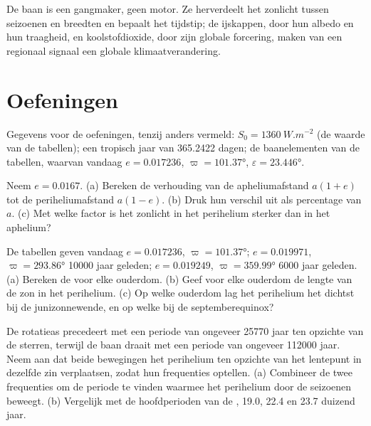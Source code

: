 De baan is een gangmaker, geen motor. Ze herverdeelt het zonlicht tussen seizoenen en breedten
en bepaalt het tijdstip; de ijskappen, door hun albedo en hun traagheid, en koolstofdioxide, door
zijn globale forcering, maken van een regionaal signaal een globale klimaatverandering.

\section*{Oefeningen}\label{sec:b2:orbital-forcing:exercises}

Gegevens voor de oefeningen, tenzij anders vermeld: $S_0 = \qty{1360}{W.m^{-2}}$ (de waarde van de
tabellen); een tropisch jaar van \num{365.2422} dagen; de baanelementen van de tabellen, waarvan vandaag
$e = 0.017236$, $\varpi = \ang{101.37}$, $\varepsilon = \ang{23.446}$.

\begin{exercise}[$\star$]\label{exo:b2:orbital-forcing:1}
Neem $e = 0.0167$. (a) Bereken de verhouding van de apheliumafstand $a(1 + e)$ tot de
periheliumafstand $a(1 - e)$. (b) Druk hun verschil uit als percentage van $a$. (c) Met welke factor is
het zonlicht in het perihelium sterker dan in het aphelium?
\end{exercise}

\begin{exercise}[$\star$]\label{exo:b2:orbital-forcing:2}
De tabellen geven vandaag $e = 0.017236$, $\varpi = \ang{101.37}$; $e = 0.019971$, $\varpi =
\ang{293.86}$ \num{10000} jaar geleden; $e = 0.019249$, $\varpi = \ang{359.99}$ \num{6000} jaar geleden.
(a) Bereken de  voor elke ouderdom. (b) Geef voor elke ouderdom de lengte van de zon in het
perihelium. (c) Op welke ouderdom lag het perihelium het dichtst bij de junizonnewende, en op welke bij de
septemberequinox?
\end{exercise}

\begin{exercise}[$\star$]\label{exo:b2:orbital-forcing:3}
De rotatieas precedeert met een periode van ongeveer \num{25770} jaar ten opzichte van de sterren, terwijl
de baan draait met een periode van ongeveer \num{112000} jaar. Neem aan dat beide bewegingen het
perihelium ten opzichte van het lentepunt in dezelfde zin verplaatsen, zodat hun frequenties optellen. (a) Combineer
de twee frequenties om de periode te vinden waarmee het perihelium
door de seizoenen beweegt. (b) Vergelijk met de hoofdperioden van de , \num{19.0},
\num{22.4} en \num{23.7} duizend jaar.
\end{exercise}

